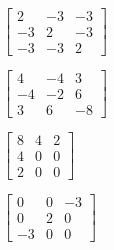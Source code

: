\begin{exercise}
\begin{Parts}
\item \(\begin{bmatrix}2&-3&-3
\\-3&2&-3
\\-3&-3&2
 \end{bmatrix}\)
\item \(\begin{bmatrix}4&-4&3
\\-4&-2&6
\\3&6&-8
 \end{bmatrix}\)
\item \(\begin{bmatrix}8&4&2
\\4&0&0
\\2&0&0
 \end{bmatrix}\)
\item \(\begin{bmatrix}0&0&-3 
\\0&2&0 
\\-3&0&0
 \end{bmatrix}\)
\end{Parts}
\end{exercise}


